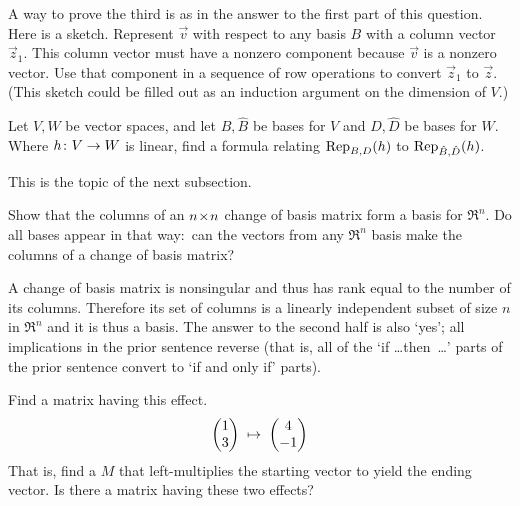 \begin{exercises}
\begin{answer}
\begin{exparts}
          A way to prove the third is as in the answer to the first part
          of this question.
          Here is a sketch.
          Represent $\vec{v}$ with respect to any basis $B$ with a column
          vector $\vec{z}_1$.
          This column vector must have a nonzero component because $\vec{v}$
          is a nonzero vector.
          Use that component in a sequence of row operations to convert 
          $\vec{z}_1$ to $\vec{z}$.
          (This sketch could be filled out as an induction 
          argument on the dimension of $V$.)  
       \end{exparts}  
     \end{answer}
  \item 
    Let \( V,W \) be vector spaces, and let \( B,\hat{B} \) be bases for
    \( V \) and \( D,\hat{D} \) be bases for \( W \).
    Where \( \map{h}{V}{W} \) is linear, find a formula relating
    \( \rep{h}{B,D} \) to \( \rep{h}{\hat{B},\hat{D}} \).
    \begin{answer}
      This is the topic of the next subsection.
    \end{answer}
  \recommended \item
    Show that the columns of an \( \nbyn{n} \) change of basis matrix
    form a basis for \( \Re^n \).
    Do all bases appear in that way:~can 
    the vectors from any $\Re^n$ basis make the columns of a change of 
    basis matrix?
    \begin{answer}
      A change of basis matrix is nonsingular and thus
      has rank equal to the number of its columns.
      Therefore its set of columns is a linearly independent subset of size 
      $n$ in $\Re^n$ and it is thus a basis.
      The answer to the second half is also `yes'; all implications in the 
      prior sentence reverse
      (that is, all of the `if \ldots then~\ldots' parts of the prior sentence
      convert to `if and only if' parts).
    \end{answer}
  \recommended \item 
    Find a matrix having this effect.
    \begin{equation*}
      \colvec{1 \\ 3}
      \;\mapsto\;
      \colvec{4 \\ -1}
    \end{equation*}
    That is, find a $M$ that left-multiplies the 
    starting vector to yield the ending vector.
    Is there a matrix having these two effects?
    \begin{exparts*}
      \partsitem
        $

\end{exparts*}
\end{exercises}
